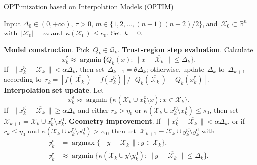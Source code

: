 \documentclass[11pt,a4paper,draft]{article}  %
\theoremstyle{definition}
\numberwithin{equation}{section}
\newcommand{\mbar}[1]{\,\overline{\!{#1}\!}\,} %
\newcommand{\xopt}{\mbar}
\DeclareMathOperator*{\argmax}{argmax}
\DeclareMathOperator*{\argmin}{argmin}
\newcommand{\RR}{\mathbb{R}}
\newcommand{\Int}{\mathcal{X}}
\newcommand{\Qua}{\mathcal{Q}}
\newcommand{\get}{{\textrm{g}}}
\newcommand{\drop}{{\textrm{d}}}
\begin{document}
\begin{algorithm}[htbp!]
    \caption{\label{alg:optim}OPTimization based on Interpolation Models (OPTIM)}
    Input $\Delta_0\in (0,+\infty)$, $\tau>0$, $m\in \{1, 2, \dots, (n+1)(n+2)/2\}$,
    and~$\Int_0\subset \RR^n$ with~$|\Int_0|=m$ and~$\kappa(\Int_0) \le \kappa_0$. Set~$k=0$.
    \begin{algorithmic}[1]
        \State \textbf{Model construction}.
        Pick~$Q_k \in \Qua_k$.
        \State \textbf{Trust-region step evaluation}.
        Calculate
        \begin{equation}
         \label{eq:xget}
         x_k^\get \approx \argmin\{Q_k(x)\mathrel{:} \|x-\xopt{\Int_k}\|\le \Delta_k\}.
        \end{equation}
        If~$\|x_k^\get-\xopt{\Int_k}\| < \alpha\Delta_k$, then set~$\Delta_{k+1} = \theta \Delta_k$;
        otherwise, update~$\Delta_k$ to~$\Delta_{k+1}$ according to~$r_k = [f(\xopt{\Int_k})
        - f(x_k^\get)]/[Q_k(\xopt{\Int_k}) - Q_k(x_k^\get)]$.
        \State \textbf{Interpolation set update}.
        Let
        \begin{equation}
            \label{eq:xdrop}
            x_k^\drop \approx \argmin\{\kappa(\Int_k\cup x_k^\get\setminus x) \mathrel{:} x \in
            \Int_k\}.
        \end{equation}
        If~$\|x_k^\get-\xopt{\Int_k}\| \ge \alpha\Delta_k$
        and either $r_k>\eta_0$ or $\kappa(\Int_k\cup x_k^\get \setminus x_k^\drop) \le \kappa_0$,
        then set~$\Int_{k+1} = \Int_k\cup x_k^\get\setminus x_k^\drop$.
        \State \textbf{Geometry improvement}.
        If~$\|x_k^\get-\xopt{\Int_k}\|< \alpha \Delta_k$, or if~$r_k\le \eta_0$ and $\kappa(\Int_k
        \cup x_k^\get\setminus x_k^\drop) > \kappa_0$, then set~$\Int_{k+1} = \Int_k\cup
        y_k^\get\setminus y_k^\drop$ with
          \begin{align}
              \label{eq:ydrop}
              y_k^\drop &= \argmax\{\|y-\xopt{\Int_k}\| \mathrel{:} y \in \Int_k\}, \\
              \label{eq:yget}
              y_k^\get &\approx \argmin\{\kappa(\Int_k \cup y \setminus y_k^\drop) \mathrel{:}
                  \|y-\xopt{\Int_k}\|\le
              \Delta_k\}.
          \end{align}
    \end{algorithmic}
\end{algorithm}
\end{document}
